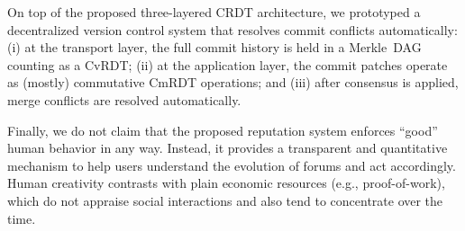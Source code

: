 \documentclass[12pt]{article}
\newcommand{\reps}     {\emph{reps}\xspace}
\begin{document}
On top of the proposed three-layered CRDT architecture, we prototyped a
decentralized version control system that resolves commit conflicts
automatically:
    (i)   at the transport layer, the full commit history is held in a
          Merkle~DAG counting as a CvRDT;
    (ii)  at the application layer, the commit patches operate as (mostly)
          commutative CmRDT operations; and
    (iii) after consensus is applied, merge conflicts are resolved
          automatically.

Finally, we do not claim that the proposed reputation system enforces ``good''
human behavior in any way.
Instead, it provides a transparent and quantitative mechanism to help users
understand the evolution of forums and act accordingly.
Human creativity contrasts with plain economic resources (e.g.,
proof-of-work), which do not appraise social interactions and also tend
to concentrate over the time.
%

\end{document}
